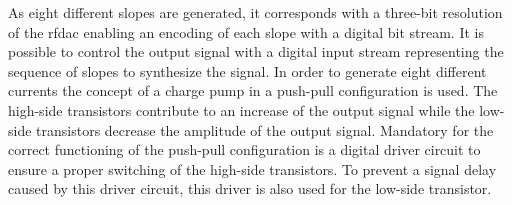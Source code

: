 \documentclass[journal]{IEEEtran}
\begin{document}
As eight different slopes are generated, it corresponds with a three-bit resolution of the \gls{rfdac} enabling an encoding of each slope with a digital bit stream.
It is possible to control the output signal with a digital input stream representing the sequence of slopes to synthesize the signal.
In order to generate eight different currents the concept of a charge pump in a push-pull configuration is used.
The high-side transistors contribute to an increase of the output signal while the low-side transistors decrease the amplitude of the output signal.
Mandatory for the correct functioning of the push-pull configuration is a digital driver circuit to ensure a proper switching of the high-side transistors.
To prevent a signal delay caused by this driver circuit, this driver is also used for the low-side transistor.
%
\end{document}
